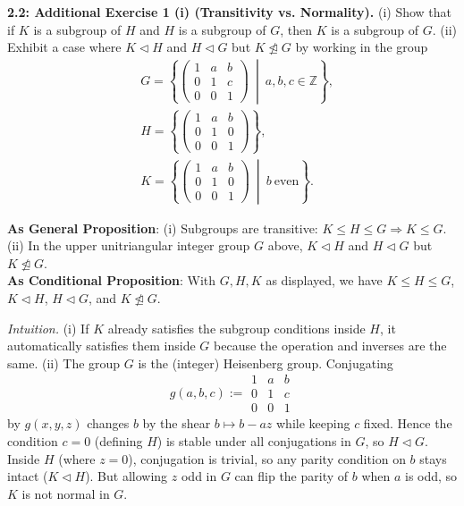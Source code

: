 \documentclass[12pt]{article}
\theoremstyle{definition}
\begin{document}
\newpage

\noindent \textbf{2.2: Additional Exercise 1 (i) (Transitivity vs. Normality).} 
(i) Show that if $K$ is a subgroup of $H$ and $H$ is a subgroup of $G$, then $K$ is a subgroup of $G$. 
(ii) Exhibit a case where $K\lhd H$ and $H\lhd G$ but $K\ntrianglelefteq G$ by working in the group
\begin{align*}
&G=\left\{\begin{pmatrix}
1 & a & b\\
0 & 1 & c\\
0 & 0 & 1
\end{pmatrix}\ \middle|\ a,b,c\in\mathbb Z\right\},
\\
&H=\left\{\begin{pmatrix}
1 & a & b\\
0 & 1 & 0\\
0 & 0 & 1
\end{pmatrix}\right\},
\\
&K=\left\{\begin{pmatrix}
1 & a & b\\
0 & 1 & 0\\
0 & 0 & 1
\end{pmatrix}\ \middle|\ b\ \text{even}\right\}.
\end{align*}%

\noindent\textbf{As General Proposition}: (i) Subgroups are transitive: $K\le H\le G\Rightarrow K\le G$. 
(ii) In the upper unitriangular integer group $G$ above, $K\lhd H$ and $H\lhd G$ but $K\ntrianglelefteq G$.\\

\noindent \textbf{As Conditional Proposition}: With $G,H,K$ as displayed, we have $K\le H\le G$, $K\lhd H$, $H\lhd G$, and $K\ntrianglelefteq G$.

\newpage

\dotfill

\emph{Intuition.} 
(i) If $K$ already satisfies the subgroup conditions inside $H$, it automatically satisfies them inside $G$ because the operation and inverses are the same.  
(ii) The group $G$ is the (integer) Heisenberg group. Conjugating 
\[
g(a,b,c):=\begin{smallmatrix}1&a&b\\0&1&c\\0&0&1\end{smallmatrix}
\]
by $g(x,y,z)$ changes $b$ by the shear $b\mapsto b-az$ while keeping $c$ fixed. Hence the condition $c=0$ (defining $H$) is stable under all conjugations in $G$, so $H\lhd G$. Inside $H$ (where $z=0$), conjugation is trivial, so any parity condition on $b$ stays intact ($K\lhd H$). But allowing $z$ odd in $G$ can flip the parity of $b$ when $a$ is odd, so $K$ is not normal in $G$.\\
\end{document}
